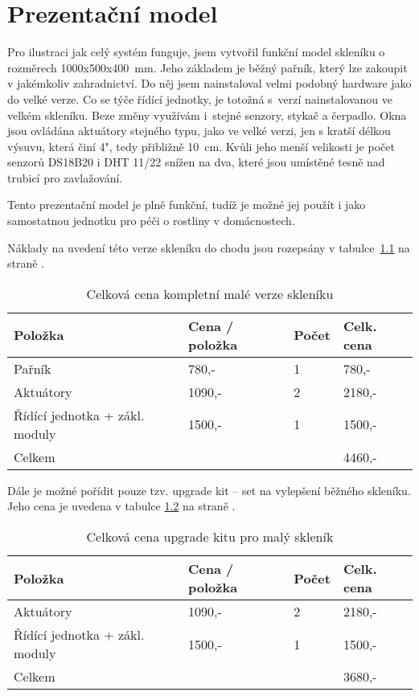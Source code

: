 \chapter{Prezentační model}
Pro ilustraci jak celý systém funguje, jsem vytvořil funkční model skleníku o rozměrech 1000x500x400~mm.
Jeho základem je běžný pařník, který lze zakoupit v jakémkoliv zahradnictví.
Do něj jsem nainstaloval velmi podobný hardware jako do velké verze.
Co se týče řídící jednotky, je totožná s~verzí nainstalovanou ve velkém skleníku.
Beze změny využívám i~stejné senzory, stykač a čerpadlo.
Okna jsou ovládána aktuátory stejného typu, jako ve velké verzi, jen s kratší délkou výsuvu, která činí 4", tedy přibližně 10~cm.
Kvůli jeho menší velikosti je počet senzorů DS18B20 i DHT 11/22 snížen na dva, které jsou umístěné tesně nad trubicí pro zavlažování.

Tento prezentační model je plně funkční, tudíž je možné jej použít i jako samostatnou jednotku pro péči o rostliny v domácnostech.

Náklady na uvedení této verze skleníku do chodu jsou rozepsány v tabulce~\ref{table:small_greenhouse_pricing_full} na straně 
\pageref{table:small_greenhouse_pricing_full}.

\begin{table}
	\centering
	\caption{Celková cena kompletní malé verze skleníku}
	\begin{tabular}{llll}
	Položka         				& Cena / položka & Počet & Celk. cena  \\ 
	\hline
	Pařník          				& 780,-          & 1     & 780,-       \\
	Aktuátory       				& 1090,-         & 2     & 2180,-      \\
	Řídící jednotka + zákl. moduly 	& 1500,-         & 1     & 1500,-      \\ 
	\hline
	Celkem         				 	&                &       & 4460,-      
	\label{table:small_greenhouse_pricing_full}
	\end{tabular}
	\end{table}

Dále je možné pořídit pouze tzv. upgrade kit -- set na vylepšení běžného skleníku. Jeho cena je uvedena v tabulce \ref{table:small_greenhouse_pricing_upgrade} na straně \pageref{table:small_greenhouse_pricing_upgrade}.

\begin{table}
	\centering
	\caption{Celková cena upgrade kitu pro malý skleník}
	\begin{tabular}{llll}
	Položka         				& Cena / položka & Počet & Celk. cena  \\ 
	\hline
	Aktuátory       				& 1090,-         & 2     & 2180,-      \\
	Řídící jednotka + zákl. moduly 	& 1500,-         & 1     & 1500,-      \\ 
	\hline
	Celkem          				&                &       & 3680,-     
	\label{table:small_greenhouse_pricing_upgrade}
	\end{tabular}
	\end{table}
